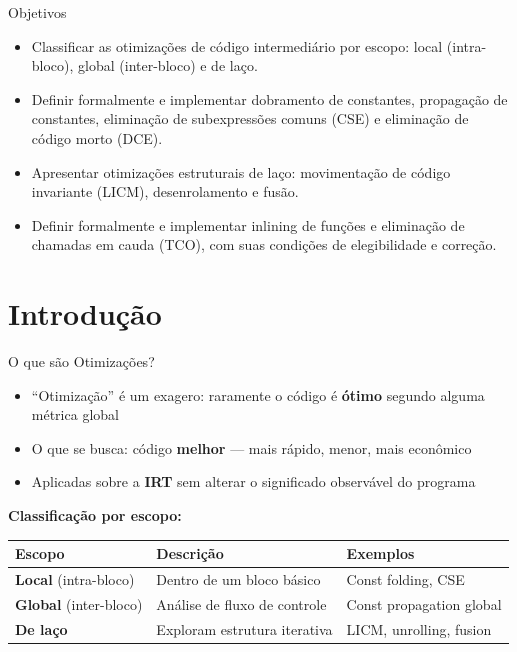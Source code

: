 \subtitle{\bf Aula 18 - Introdução}
\begin{frame}[t,plain]
    \titlepage
\end{frame}

\begin{frame}{Objetivos}

    \begin{itemize}
        \item
        Classificar as otimizações de código intermediário por escopo: local
        (intra-bloco), global (inter-bloco) e de laço.
        \item
        Definir formalmente e implementar dobramento de constantes, propagação
        de constantes, eliminação de subexpressões comuns (CSE) e eliminação
        de código morto (DCE).
        \item
        Apresentar otimizações estruturais de laço: movimentação de código
        invariante (LICM), desenrolamento e fusão.
        \item
        Definir formalmente e implementar inlining de funções e eliminação de
        chamadas em cauda (TCO), com suas condições de elegibilidade e
        correção.
    \end{itemize}
\end{frame}


\section{Introdução}\label{introduuxe7uxe3o}

\begin{frame}{O que são Otimizações?}

    \begin{itemize}

        \item
        ``Otimização'' é um exagero: raramente o código é \textbf{ótimo}
        segundo alguma métrica global
        \item
        O que se busca: código \textbf{melhor} --- mais rápido, menor, mais
        econômico
        \item
        Aplicadas sobre a \textbf{IRT} sem alterar o significado observável do
        programa
    \end{itemize}

    \textbf{Classificação por escopo:}

    \begin{table}
        \begin{tabular}{l l l}
            \hline
            Escopo & Descrição & Exemplos \\
    \hline
    \textbf{Local} (intra-bloco) & Dentro de um bloco básico & Const
    folding, CSE \\
    \textbf{Global} (inter-bloco) & Análise de fluxo de controle & Const
    propagation global \\
    \textbf{De laço} & Exploram estrutura iterativa & LICM, unrolling,
    fusion \\
    \hline
\end{tabular}
\end{table}
\end{frame}

